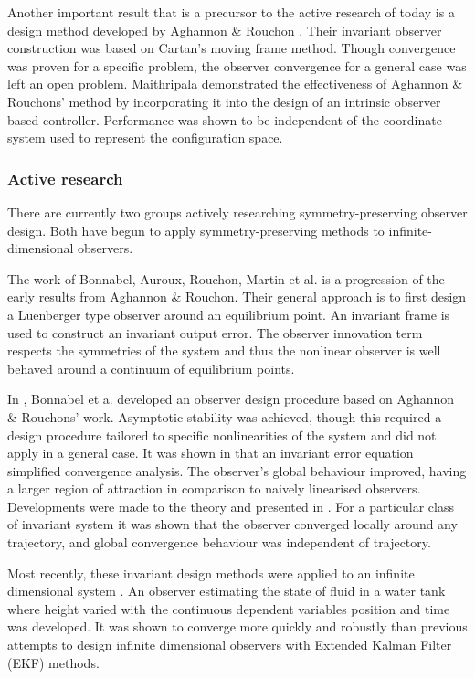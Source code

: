 Another important result that is a precursor to the active research of today is a design method developed by Aghannon \& Rouchon \cite{aghannan2002invariant}. Their invariant observer construction was based on Cartan's moving frame method. Though convergence was proven for a specific problem, the observer convergence for a general case was left an open problem. Maithripala \cite{maithripala2005intrinsic} demonstrated the effectiveness of Aghannon \& Rouchons' method by incorporating it into the design of an intrinsic observer based controller. Performance was shown to be independent of the coordinate system used to represent the configuration space.

\subsubsection{Active research}
There are currently two groups actively researching symmetry-preserving observer design.  Both have begun to apply symmetry-preserving methods to infinite-dimensional observers.

The work of Bonnabel, Auroux, Rouchon, Martin et al. is a progression of the early results from Aghannon \& Rouchon. Their general approach is to first design a Luenberger type observer around an equilibrium point. An invariant frame is used to construct an invariant output error. The observer innovation term respects the symmetries of the system and thus the nonlinear observer is well behaved around a continuum of equilibrium points. 

In \cite{bonnabel2005invariant}, Bonnabel et a. developed an observer design procedure based on Aghannon \& Rouchons' work. Asymptotic stability was achieved, though this required a design procedure tailored to specific nonlinearities of the system and did not apply in a general case.
It was shown in \cite{bonnabel2008symmetry} that an invariant error equation simplified convergence analysis. The observer's global behaviour improved, having a larger region of attraction in comparison to naively linearised observers.
Developments were made to the theory and presented in \cite{bonnabel2009non}. For a particular class of invariant system it was shown that the observer converged locally around any trajectory, and global convergence behaviour was independent of trajectory.

Most recently, these invariant design methods were applied to an infinite dimensional system \cite{auroux2011symmetry}. An observer estimating the state of fluid in a water tank where height varied with the continuous dependent variables position and time was developed. It was shown to converge more quickly and robustly than previous attempts to design infinite dimensional observers with Extended Kalman Filter (EKF) methods.

